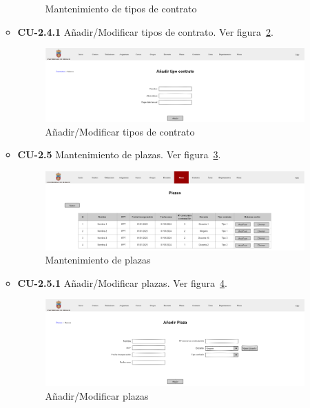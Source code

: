 \begin{itemize}
\begin{itemize}
\begin{figure}[!h]
		\caption{Mantenimiento de tipos de contrato}\label{F-CU2.4}
		\end{figure}
		\FloatBarrier
\newpage
		\item \textbf{CU-2.4.1} Añadir/Modificar tipos de contrato. Ver figura~\ref{F-CU2.4.1}.
		\begin{figure}[!h]
		\centering
		\includegraphics[width=\textwidth]{../img/Anexos/Vistas/add_contrato.png}
		\caption{Añadir/Modificar tipos de contrato}\label{F-CU2.4.1}
		\end{figure}
		\FloatBarrier
		\item \textbf{CU-2.5} Mantenimiento de plazas. Ver figura~\ref{F-CU2.5}.
		\begin{figure}[!h]
		\centering
		\includegraphics[width=\textwidth]{../img/Anexos/Vistas/plazas.png}
		\caption{Mantenimiento de plazas}\label{F-CU2.5}
		\end{figure}
		\FloatBarrier
\newpage
		\item \textbf{CU-2.5.1} Añadir/Modificar plazas. Ver figura~\ref{F-CU2.5.1}.
		\begin{figure}[!h]
		\centering
		\includegraphics[width=\textwidth]{../img/Anexos/Vistas/add_plaza.png}
		\caption{Añadir/Modificar plazas}\label{F-CU2.5.1}
		\end{figure}

\end{itemize}
\end{itemize}
